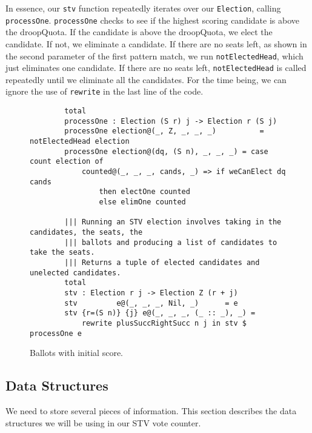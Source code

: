 In essence, our \texttt{stv} function repeatedly iterates over our
\texttt{Election}, calling \texttt{processOne}. \texttt{processOne}
checks to see if the highest scoring candidate is above the droopQuota. If the
candidate is above the droopQuota, we elect the candidate. If not, we eliminate
a candidate. If there are no seats left, as shown in the second parameter of the
first pattern match, we run \texttt{notElectedHead}, which just eliminates one
candidate. If there are no seats left, \texttt{notElectedHead} is called
repeatedly until we eliminate all the candidates. For the time being, we can
ignore the use of \texttt{rewrite} in the last line of the code. 

\begin{figure}[htbp!!!!!!!!]
	\caption{Ballots with initial score.}
	\label{overall_code}
	\begin{lstlisting}
        total
        processOne : Election (S r) j -> Election r (S j)
        processOne election@(_, Z, _, _, _)          = notElectedHead election
        processOne election@(dq, (S n), _, _, _) = case count election of
            counted@(_, _, _, cands, _) => if weCanElect dq cands
                then electOne counted
                else elimOne counted

        ||| Running an STV election involves taking in the candidates, the seats, the
        ||| ballots and producing a list of candidates to take the seats. 
        ||| Returns a tuple of elected candidates and unelected candidates.
        total
        stv : Election r j -> Election Z (r + j)
        stv         e@(_, _, _, Nil, _)      = e
        stv {r=(S n)} {j} e@(_, _, _, (_ :: _), _) = 
            rewrite plusSuccRightSucc n j in stv $ processOne e
    \end{lstlisting}
\end{figure}

\subsection{Data Structures}

We need to store several pieces of information. This section describes the data
structures we will be using in our STV vote counter.

